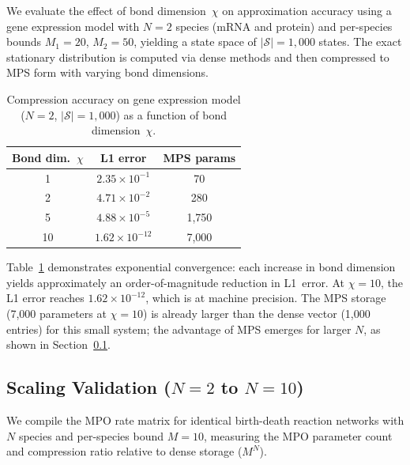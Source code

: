 \documentclass[11pt]{article}
\newcommand{\calS}{\mathcal{S}}
\begin{document}
We evaluate the effect of bond dimension~$\chi$ on approximation
accuracy using a gene expression model with $N=2$ species
(mRNA and protein) and per-species bounds $M_1=20$, $M_2=50$,
yielding a state space of $|\calS| = 1{,}000$ states.
The exact stationary distribution is computed via dense methods and
then compressed to MPS form with varying bond dimensions.

\begin{table}[t]
\centering
\caption{Compression accuracy on gene expression model ($N=2$,
  $|\calS|=1{,}000$) as a function of bond dimension~$\chi$.}
\label{tab:compression}
\begin{tabular}{ccc}
\toprule
\textbf{Bond dim.\ $\chi$} & \textbf{L1 error} & \textbf{MPS params} \\
\midrule
1  & $2.35 \times 10^{-1}$ & 70 \\
2  & $4.71 \times 10^{-2}$ & 280 \\
5  & $4.88 \times 10^{-5}$ & 1{,}750 \\
10 & $1.62 \times 10^{-12}$ & 7{,}000 \\
\bottomrule
\end{tabular}
\end{table}

Table~\ref{tab:compression} demonstrates exponential convergence:
each increase in bond dimension yields approximately an order-of-magnitude
reduction in L1~error.
At $\chi=10$, the L1 error reaches $1.62 \times 10^{-12}$, which is
at machine precision.
The MPS storage (7{,}000 parameters at $\chi=10$) is already larger
than the dense vector (1{,}000 entries) for this small system;
the advantage of MPS emerges for larger $N$, as shown in
Section~\ref{sec:exp:scaling}.

\subsection{Scaling Validation ($N=2$ to $N=10$)}\label{sec:exp:scaling}

We compile the MPO rate matrix for identical birth-death reaction
networks with $N$ species and per-species bound $M=10$, measuring
the MPO parameter count and compression ratio relative to dense
storage ($M^N$).
\end{document}
